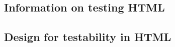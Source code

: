 

\subsection{Information on testing HTML \gdauts{}}


\subsection{Design for testability in HTML \gdauts{}}
\label{DFTWeb}

